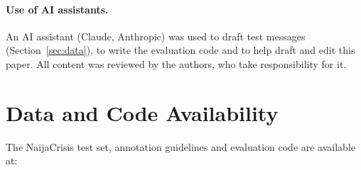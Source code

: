 \paragraph{Use of AI assistants.} An AI assistant (Claude, Anthropic) was used to draft test messages (Section~\ref{sec:data}), to write the evaluation code and to help draft and edit this paper. All content was reviewed by the authors, who take responsibility for it.

\section*{Data and Code Availability}
The NaijaCrisis test set, annotation guidelines and evaluation code are available at:

\begin{center}\repourl\end{center}

